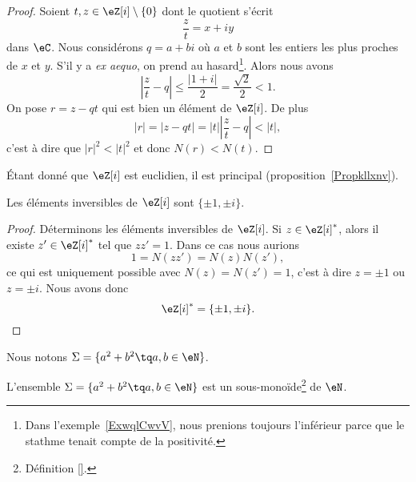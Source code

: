 \begin{proof}
    Soient \( t,z\in \eZ[i]\setminus\{ 0 \}\) dont le quotient s'écrit
    \begin{equation}
        \frac{ z }{ t }=x+iy
    \end{equation}
    dans \( \eC\). Nous considérons \( q=a+bi\) où \( a\) et \( b\) sont les entiers les plus proches de \( x\) et \( y\). S'il y a \emph{ex aequo}, on prend au hasard\footnote{Dans l'exemple~\ref{ExwqlCwvV}, nous prenions toujours l'inférieur parce que le stathme tenait compte de la positivité.}. Alors nous avons
    \begin{equation}
        | \frac{ z }{ t }-q |\leq \frac{ | 1+i | }{ 2 }=\frac{ \sqrt{2} }{2}<1.
    \end{equation}
    On pose \( r=z-qt\) qui est bien un élément de \( \eZ[i]\). De plus
    \begin{equation}
        | r |=| z-qt |=| t | |\frac{ z }{ t }-q |<| t |,
    \end{equation}
    c'est à dire que \( | r |^2<| t |^2\) et donc \( N(r)<N(t)\).
\end{proof}
Étant donné que \( \eZ[i]\) est euclidien, il est principal (proposition~\ref{Propkllxnv}).

\begin{lemma}   \label{LemBMEIiiV}
    Les éléments inversibles de \( \eZ[i]\) sont \( \{ \pm 1,\pm i \}\).
\end{lemma}

\begin{proof}

    Déterminons les éléments inversibles de \( \eZ[i]\). Si \( z\in \eZ[i]^*\), alors il existe \( z'\in \eZ[i]^*\) tel que \( zz'=1\). Dans ce cas nous aurions
    \begin{equation}
        1=N(zz')=N(z)N(z'),
    \end{equation}
    ce qui est uniquement possible avec \( N(z)=N(z')=1\), c'est à dire \( z=\pm 1\) ou \( z=\pm i\). Nous avons donc
    \begin{equation}
        \eZ[i]^*=\{ \pm 1,\pm i \}.
    \end{equation}
\end{proof}

Nous notons \( \Sigma=\{ a^2+b^2\tq a,b\in \eN \}\).
\begin{lemma}   \label{LemIBDPzMB}
    L'ensemble \( \Sigma=  \{ a^2+b^2\tq a,b\in \eN \}  \) est un sous-monoïde\footnote{Définition \ref{}.} de \( \eN\).
\end{lemma}

